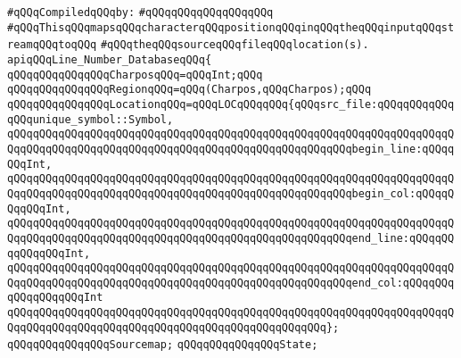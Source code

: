 \label{src/lib/compiler/back/low/tools/line-number-db/line-number-database.api}
\newline
\verb|#qQQqCompiledqQQqby:|\newline
\verb|#qQQqqQQqqQQqqQQqqQQq|\newline
\newline
\verb|#qQQqThisqQQqmapsqQQqcharacterqQQqpositionqQQqinqQQqtheqQQqinputqQQqstreamqQQqtoqQQq|\newline
\verb|#qQQqtheqQQqsourceqQQqfileqQQqlocation(s).|\newline
\newline
\verb|apiqQQqLine_Number_DatabaseqQQq{|\newline
\newline
\newline
\verb|qQQqqQQqqQQqqQQqCharposqQQq=qQQqInt;qQQq|\newline
\newline
\verb|qQQqqQQqqQQqqQQqRegionqQQq=qQQq(Charpos,qQQqCharpos);qQQq|\newline
\newline
\verb|qQQqqQQqqQQqqQQqLocationqQQq=qQQqLOCqQQqqQQq{qQQqsrc_file:qQQqqQQqqQQqqQQqunique_symbol::Symbol,|\newline
\verb|qQQqqQQqqQQqqQQqqQQqqQQqqQQqqQQqqQQqqQQqqQQqqQQqqQQqqQQqqQQqqQQqqQQqqQQqqQQqqQQqqQQqqQQqqQQqqQQqqQQqqQQqqQQqqQQqqQQqqQQqqQQqbegin_line:qQQqqQQqInt,|\newline
\verb|qQQqqQQqqQQqqQQqqQQqqQQqqQQqqQQqqQQqqQQqqQQqqQQqqQQqqQQqqQQqqQQqqQQqqQQqqQQqqQQqqQQqqQQqqQQqqQQqqQQqqQQqqQQqqQQqqQQqqQQqqQQqbegin_col:qQQqqQQqqQQqInt,|\newline
\verb|qQQqqQQqqQQqqQQqqQQqqQQqqQQqqQQqqQQqqQQqqQQqqQQqqQQqqQQqqQQqqQQqqQQqqQQqqQQqqQQqqQQqqQQqqQQqqQQqqQQqqQQqqQQqqQQqqQQqqQQqqQQqend_line:qQQqqQQqqQQqqQQqInt,|\newline
\verb|qQQqqQQqqQQqqQQqqQQqqQQqqQQqqQQqqQQqqQQqqQQqqQQqqQQqqQQqqQQqqQQqqQQqqQQqqQQqqQQqqQQqqQQqqQQqqQQqqQQqqQQqqQQqqQQqqQQqqQQqqQQqend_col:qQQqqQQqqQQqqQQqqQQqInt|\newline
\verb|qQQqqQQqqQQqqQQqqQQqqQQqqQQqqQQqqQQqqQQqqQQqqQQqqQQqqQQqqQQqqQQqqQQqqQQqqQQqqQQqqQQqqQQqqQQqqQQqqQQqqQQqqQQqqQQqqQQqqQQq};|\newline
\newline
\verb|qQQqqQQqqQQqqQQqSourcemap;|\newline
\verb|qQQqqQQqqQQqqQQqState;|\newline

